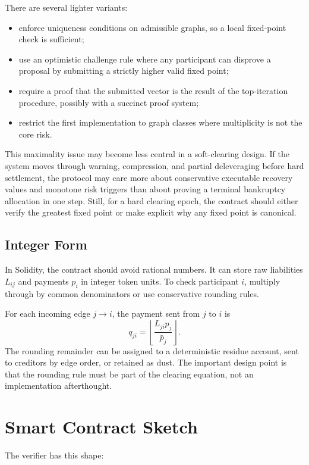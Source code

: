 \documentclass[11pt,oneside]{article}
\newcommand{\barp}{\bar p}
\begin{document}
There are several lighter variants:

\begin{itemize}[leftmargin=1.5em]
  \item enforce uniqueness conditions on admissible graphs, so a local
  fixed-point check is sufficient;
  \item use an optimistic challenge rule where any participant can disprove a
  proposal by submitting a strictly higher valid fixed point;
  \item require a proof that the submitted vector is the result of the
  top-iteration procedure, possibly with a succinct proof system;
  \item restrict the first implementation to graph classes where multiplicity is
  not the core risk.
\end{itemize}

This maximality issue may become less central in a soft-clearing design. If the
system moves through warning, compression, and partial deleveraging before hard
settlement, the protocol may care more about conservative executable recovery
values and monotone risk triggers than about proving a terminal bankruptcy
allocation in one step. Still, for a hard clearing epoch, the contract should
either verify the greatest fixed point or make explicit why any fixed point is
canonical.

\subsection{Integer Form}

In Solidity, the contract should avoid rational numbers. It can store raw
liabilities $L_{ij}$ and payments $p_i$ in integer token units. To check
participant $i$, multiply through by common denominators or use conservative
rounding rules.

For each incoming edge $j \to i$, the payment sent from $j$ to $i$ is
\[
  q_{ji} = \left\lfloor \frac{L_{ji}p_j}{\barp_j} \right\rfloor.
\]
The rounding remainder can be assigned to a deterministic residue account, sent
to creditors by edge order, or retained as dust. The important design point is
that the rounding rule must be part of the clearing equation, not an
implementation afterthought.

\section{Smart Contract Sketch}

The verifier has this shape:
\end{document}
